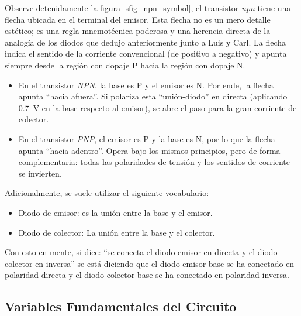 Observe detenidamente la figura \ref{sfig_npn_symbol}, el transistor \emph{npn} tiene una flecha ubicada en el terminal del emisor. Esta flecha no es un mero detalle estético; es una regla mnemotécnica poderosa y una herencia directa de la analogía de los diodos que dedujo anteriormente junto a Luis y Carl. La flecha indica el sentido de la corriente convencional (de positivo a negativo) y apunta siempre desde la región con dopaje P hacia la región con dopaje N.
\begin{itemize}
  \item En el transistor \textit{NPN}, la base es P y el emisor es N. Por ende, la flecha apunta ``hacia afuera''. Si polariza esta ``unión-diodo'' en directa (aplicando \qty{0.7}{\volt} en la base respecto al emisor), se abre el paso para la gran corriente de colector.
  \item En el transistor \textit{PNP}, el emisor es P y la base es N, por lo que la flecha apunta ``hacia adentro''. Opera bajo los mismos principios, pero de forma complementaria: todas las polaridades de tensión y los sentidos de corriente se invierten.
\end{itemize}

Adicionalmente, se suele utilizar el siguiente vocabulario:
\begin{itemize}
  \item Diodo de emisor: es la unión entre la base y el emisor.
  \item Diodo de colector: La unión entre la base y el colector.
\end{itemize}
Con esto en mente, si dice: ``se conecta el diodo emisor en directa y el diodo colector en inversa'' se está diciendo que el diodo emisor-base se ha conectado en polaridad directa y el diodo colector-base se ha conectado en polaridad inversa.

\subsection{Variables Fundamentales del Circuito}

